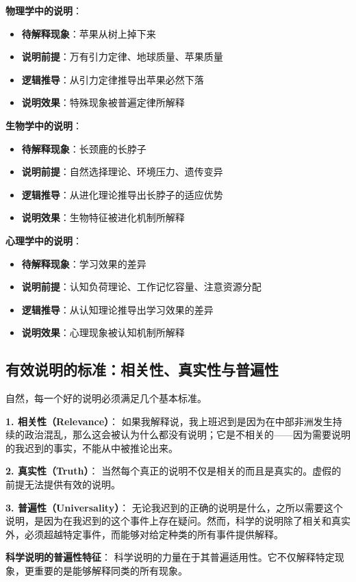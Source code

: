 \begin{examplebox}[title=说明逻辑结构的具体实例]
\textbf{物理学中的说明}：
\begin{itemize}
\item \textbf{待解释现象}：苹果从树上掉下来
\item \textbf{说明前提}：万有引力定律、地球质量、苹果质量
\item \textbf{逻辑推导}：从引力定律推导出苹果必然下落
\item \textbf{说明效果}：特殊现象被普遍定律所解释
\end{itemize}

\textbf{生物学中的说明}：
\begin{itemize}
\item \textbf{待解释现象}：长颈鹿的长脖子
\item \textbf{说明前提}：自然选择理论、环境压力、遗传变异
\item \textbf{逻辑推导}：从进化理论推导出长脖子的适应优势
\item \textbf{说明效果}：生物特征被进化机制所解释
\end{itemize}

\textbf{心理学中的说明}：
\begin{itemize}
\item \textbf{待解释现象}：学习效果的差异
\item \textbf{说明前提}：认知负荷理论、工作记忆容量、注意资源分配
\item \textbf{逻辑推导}：从认知理论推导出学习效果的差异
\item \textbf{说明效果}：心理现象被认知机制所解释
\end{itemize}
\end{examplebox}

\subsection{有效说明的标准：相关性、真实性与普遍性}

\begin{theorembox}[title=有效说明的基本要求]
自然，每一个好的说明必须满足几个基本标准。

\textbf{1. 相关性（Relevance）}：
如果我解释说，我上班迟到是因为在中部非洲发生持续的政治混乱，那么这会被认为什么都没有说明；它是不相关的——因为需要说明的我迟到的事实，不能从中被推论出来。

\textbf{2. 真实性（Truth）}：
当然每个真正的说明不仅是相关的而且是真实的。虚假的前提无法提供有效的说明。

\textbf{3. 普遍性（Universality）}：
无论我迟到的正确的说明是什么，之所以需要这个说明，是因为在我迟到的这个事件上存在疑问。然而，科学的说明除了相关和真实外，必须超越特定事件，而能够对给定种类的所有事件提供解释。

\textbf{科学说明的普遍性特征}：
科学说明的力量在于其普遍适用性。它不仅解释特定现象，更重要的是能够解释同类的所有现象。
\end{theorembox}

